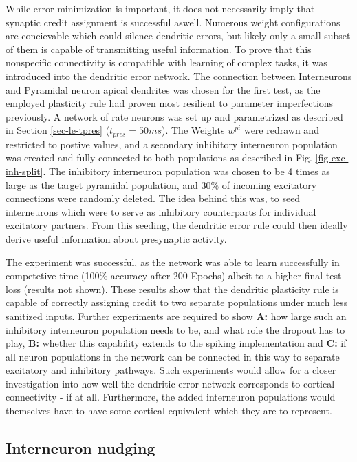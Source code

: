 While error minimization is important, it does not necessarily imply that synaptic credit assignment is successful
aswell. Numerous weight configurations are concievable which could silence dendritic errors, but likely only a small
subset of them is capable of transmitting useful information. To prove that this nonspecific connectivity is compatible
with learning of complex tasks, it was introduced into the dendritic error network. The connection between Interneurons
and Pyramidal neuron apical dendrites was chosen for the first test, as the employed plasticity rule had proven most
resilient to parameter imperfections previously. A network of rate neurons was set up and parametrized as described in
Section \ref{sec-le-tpres} ($t_{pres}= 50ms$). The Weights $w^{pi}$ were redrawn and restricted to postive values, and a
secondary inhibitory interneuron population was created and fully connected to both populations as described in Fig.
\ref{fig-exc-inh-split}. The inhibitory interneuron population was chosen to be 4 times as large as the target pyramidal
population, and $30\%$ of incoming excitatory connections were randomly deleted. The idea behind this was, to seed
interneurons which were to serve as inhibitory counterparts for individual excitatory partners. From this seeding, the
dendritic error rule could then ideally derive useful information about presynaptic activity.

The experiment was successful, as the network was able to learn successfully in competetive time (100\% accuracy after
200 Epochs) albeit to a higher final test loss (results not shown). These results show that the dendritic plasticity
rule is capable of correctly assigning credit to two separate populations under much less sanitized inputs. Further
experiments are required to show \textbf{A:} how large such an inhibitory interneuron population needs to be, and what
role the dropout has to play, \textbf{B:} whether this capability extends to the spiking implementation and \textbf{C:}
if all neuron populations in the network can be connected in this way to separate excitatory and inhibitory pathways.
Such experiments would allow for a closer investigation into how well the dendritic error network corresponds to
cortical connectivity - if at all. Furthermore, the added interneuron populations would themselves have to have some
cortical equivalent which they are to represent.


\subsection{Interneuron nudging}

